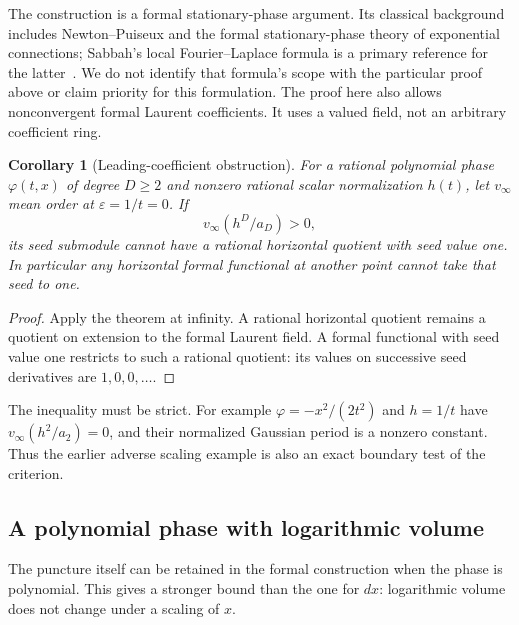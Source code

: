 \documentclass[11pt]{article}
\newtheorem{corollary}[theorem]{Corollary}
\theoremstyle{definition}\newtheorem{definition}[theorem]{Definition}
\theoremstyle{remark}\newtheorem{remark}[theorem]{Remark}
\begin{document}
The construction is a formal stationary-phase argument. Its classical
background includes Newton--Puiseux and the formal stationary-phase
theory of exponential connections; Sabbah's local Fourier--Laplace
formula is a primary reference for the latter~\cite{SabbahStationary}.
We do not identify that formula's scope with the particular proof
above or claim priority for this formulation. The proof here also
allows nonconvergent formal Laurent coefficients. It uses a valued
field, not an arbitrary coefficient ring.

\begin{corollary}[Leading-coefficient obstruction]\label{cor:leadingobstruction}
For a rational polynomial phase $\varphi(t,x)$ of degree $D\geq2$
and nonzero rational scalar normalization $h(t)$, let $v_\infty$
mean order at $\varepsilon=1/t=0$. If
\begin{equation}\label{eq:leadingcriterion}
 v_\infty(h^D/a_D)>0,
\end{equation}
its seed submodule cannot have a rational horizontal quotient with
seed value one. In particular any horizontal formal functional at
another point cannot take that seed to one.
\end{corollary}
\begin{proof}
Apply the theorem at infinity. A rational horizontal quotient remains
a quotient on extension to the formal Laurent field. A formal
functional with seed value one restricts to such a rational quotient:
its values on successive seed derivatives are $1,0,0,\ldots$.
\end{proof}

The inequality must be strict. For example
$\varphi=-x^2/(2t^2)$ and $h=1/t$ have
$v_\infty(h^2/a_2)=0$, and their normalized Gaussian period is a
nonzero constant. Thus the earlier adverse scaling example is also
an exact boundary test of the criterion.


\subsection{A polynomial phase with logarithmic volume}\label{sec:puncturedpoly}

The puncture itself can be retained in the formal construction when
the phase is polynomial. This gives a stronger bound than the one for
$dx$: logarithmic volume does not change under a scaling of $x$.
\end{document}
